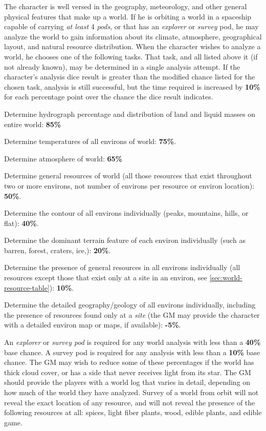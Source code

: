 The character is well versed in the geography, meteorology, and other
general physical features that make up a world.  If he is orbiting a
world in a spaceship capable of carrying \emph{at least} 4
\emph{pods}, or that has an \emph{explorer} or \emph{survey} pod, he
may analyze the world to gain information about its climate,
atmosphere, geographical layout, and natural resource distribution.
When the character wishes to analyze a world, he chooses one of the
following tasks.  That task, and all listed above it (if not already
known), may be determined in a single analysis attempt.  If the
character's analysis dice result is greater than the modified chance
listed for the chosen task, analysis is still successful, but the time
required is increased by \textbf{10\%} for each percentage point over
the chance the dice result indicates.

\begin{tasklist}
\item Determine hydrograph percentage and distribution of land and
  liquid masses on entire world: \textbf{85\%}
\item Determine temperatures of all environs of world: \textbf{75\%}.
\item Determine atmosphere of world: \textbf{65\%}
\item Determine general resources of world (all those resources that
  exist throughout two or more environs, not number of environs per
  resource or environ location): \textbf{50\%}.
\item Determine the contour of all environs individually (peaks,
  mountains, hills, or flat): \textbf{40\%}.
\item Determine the dominant terrain feature of each environ
  individually (such as barren, forest, craters, ice,): \textbf{20\%}.
\item Determine the presence of general resources in all environs
  individually (all resources except those that exist only at a site
  in an environ, see \ref{sec:world-resource-table}): \textbf{10\%}.
\item Determine the detailed geography/geology of all environs
  individually, including the presence of resources found only at a
  \emph{site} (the GM may provide the character with a detailed
  environ map or maps, if available): \textbf{-5\%}.
\end{tasklist}

An \emph{explorer} or \emph{survey pod} is required for any world
analysis with less than a \textbf{40\%} base chance.  A survey pod is
required for any analysis with less than a \textbf{10\%} base chance.
The GM may wish to reduce some of these percentages if the world has
thick cloud cover, or has a side that never receives light from its
star.  The GM should provide the players with a world log that varies
in detail, depending on how much of the world they have analyzed.
Survey of a world from orbit will not reveal the exact location of any
resource, and will not reveal the presence of the following resources
at all: spices, light fiber plants, wood, edible plants, and edible
game.

